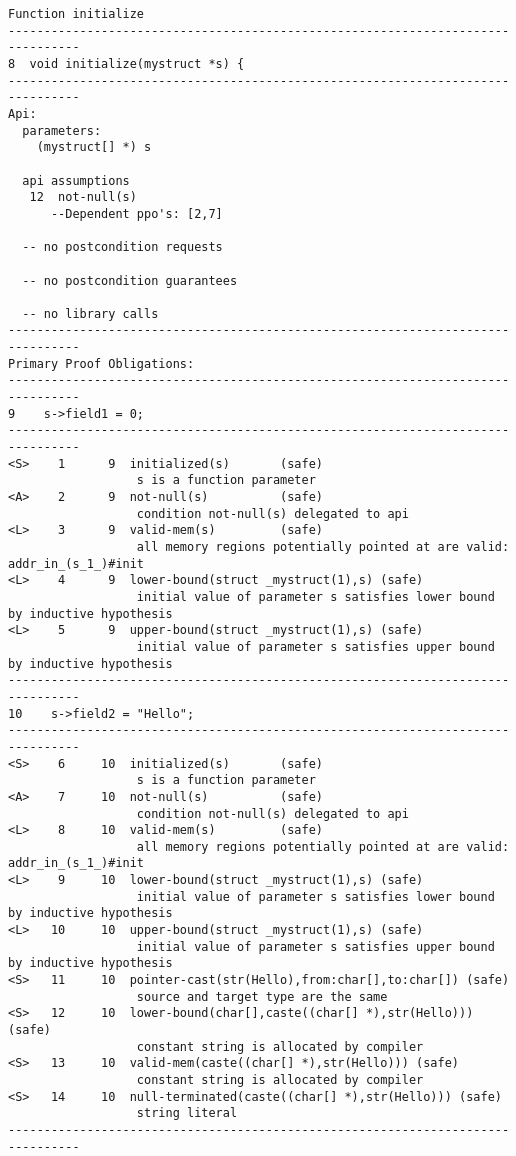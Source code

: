 \documentclass[11pt]{article}
\begin{document}
\begin{scriptsize}
\begin{verbatim}
Function initialize
--------------------------------------------------------------------------------
8  void initialize(mystruct *s) {
--------------------------------------------------------------------------------
Api:
  parameters:
    (mystruct[] *) s

  api assumptions
   12  not-null(s)
      --Dependent ppo's: [2,7]

  -- no postcondition requests

  -- no postcondition guarantees

  -- no library calls
--------------------------------------------------------------------------------
Primary Proof Obligations:
--------------------------------------------------------------------------------
9    s->field1 = 0;
--------------------------------------------------------------------------------
<S>    1      9  initialized(s)       (safe)
                  s is a function parameter
<A>    2      9  not-null(s)          (safe)
                  condition not-null(s) delegated to api
<L>    3      9  valid-mem(s)         (safe)
                  all memory regions potentially pointed at are valid: addr_in_(s_1_)#init
<L>    4      9  lower-bound(struct _mystruct(1),s) (safe)
                  initial value of parameter s satisfies lower bound by inductive hypothesis
<L>    5      9  upper-bound(struct _mystruct(1),s) (safe)
                  initial value of parameter s satisfies upper bound by inductive hypothesis
--------------------------------------------------------------------------------
10    s->field2 = "Hello";
--------------------------------------------------------------------------------
<S>    6     10  initialized(s)       (safe)
                  s is a function parameter
<A>    7     10  not-null(s)          (safe)
                  condition not-null(s) delegated to api
<L>    8     10  valid-mem(s)         (safe)
                  all memory regions potentially pointed at are valid: addr_in_(s_1_)#init
<L>    9     10  lower-bound(struct _mystruct(1),s) (safe)
                  initial value of parameter s satisfies lower bound by inductive hypothesis
<L>   10     10  upper-bound(struct _mystruct(1),s) (safe)
                  initial value of parameter s satisfies upper bound by inductive hypothesis
<S>   11     10  pointer-cast(str(Hello),from:char[],to:char[]) (safe)
                  source and target type are the same
<S>   12     10  lower-bound(char[],caste((char[] *),str(Hello))) (safe)
                  constant string is allocated by compiler
<S>   13     10  valid-mem(caste((char[] *),str(Hello))) (safe)
                  constant string is allocated by compiler
<S>   14     10  null-terminated(caste((char[] *),str(Hello))) (safe)
                  string literal
--------------------------------------------------------------------------------


\end{verbatim}
\end{scriptsize}
\end{document}
